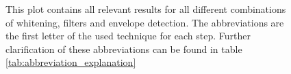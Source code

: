 \begin{figure}[h!t]
	\begin{center}
	\noindent{}
	\end{center}
	\caption{This plot contains all relevant results for all different combinations of whitening, filters and envelope detection. The abbreviations are the first letter of the used technique for each step. Further clarification of these abbreviations can be found in table \ref{tab:abbreviation_explanation}}
	\label{fig:result_all_lagerrorscaling}
\end{figure}


